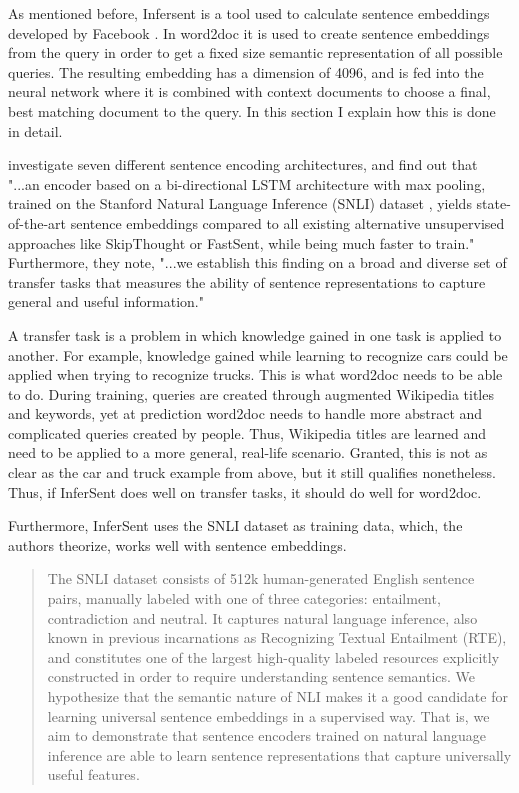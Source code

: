 As mentioned before, Infersent is a tool used to calculate sentence embeddings developed by Facebook \citep{infersent}.
In word2doc it is used to create sentence embeddings from the query in order to get a fixed
size semantic representation of all possible queries. The resulting embedding has a dimension of 4096, and is fed into the neural
network where it is combined with context documents to choose a final, best matching document to the query. In this section I
explain how this is done in detail.

\citet{infersent} investigate seven different sentence encoding architectures, and find out that
"...an encoder based on a bi-directional LSTM architecture with max pooling, trained on the Stanford Natural Language Inference (SNLI)
dataset \citep{bowmanAPM15}, yields state-of-the-art sentence embeddings compared to all existing alternative unsupervised
approaches like SkipThought or FastSent, while being much faster to train." Furthermore, they note, "...we establish this finding on a
broad and diverse set of transfer tasks that measures the ability of sentence representations to capture general and useful
information."

A transfer task is a problem in which knowledge gained in one task is applied to another. For example, knowledge
gained while learning to recognize cars could be applied when trying to recognize trucks. This is what word2doc needs to be able to
do. During training, queries are created through augmented Wikipedia titles and keywords, yet at prediction word2doc needs to
handle more abstract and complicated queries created by people. Thus, Wikipedia titles are learned and need to be applied to a more
general, real-life scenario. Granted, this is not as clear as the car and truck example from above, but it still qualifies
nonetheless. Thus, if InferSent does well on transfer tasks, it should do well for word2doc.


Furthermore, InferSent uses the SNLI dataset as training data, which, the authors theorize, works well with sentence embeddings.

\begin{quote}
The SNLI dataset consists of 512k human-generated English sentence pairs, manually labeled with one
of three categories: entailment, contradiction and neutral. It captures natural language inference, also known in previous
incarnations as Recognizing Textual Entailment (RTE), and constitutes one of the largest high-quality labeled resources explicitly
constructed in order to require understanding sentence semantics. We hypothesize that the semantic nature of NLI makes it a good
candidate for learning universal sentence embeddings in a supervised way. That is, we aim to demonstrate that sentence encoders
trained on natural language inference are able to learn sentence representations that capture universally useful features.
\end{quote} \citep{infersent}

